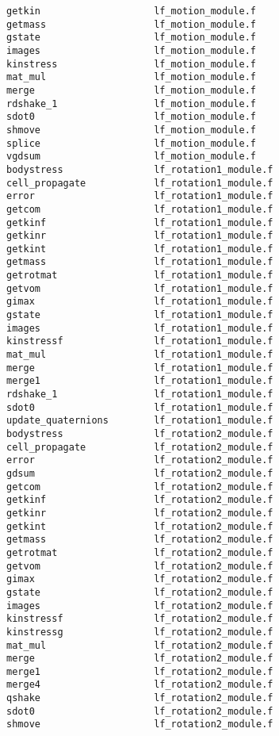 \begin{verbatim}
getkin                    lf_motion_module.f
getmass                   lf_motion_module.f
gstate                    lf_motion_module.f
images                    lf_motion_module.f
kinstress                 lf_motion_module.f
mat_mul                   lf_motion_module.f
merge                     lf_motion_module.f
rdshake_1                 lf_motion_module.f
sdot0                     lf_motion_module.f
shmove                    lf_motion_module.f
splice                    lf_motion_module.f
vgdsum                    lf_motion_module.f
bodystress                lf_rotation1_module.f
cell_propagate            lf_rotation1_module.f
error                     lf_rotation1_module.f
getcom                    lf_rotation1_module.f
getkinf                   lf_rotation1_module.f
getkinr                   lf_rotation1_module.f
getkint                   lf_rotation1_module.f
getmass                   lf_rotation1_module.f
getrotmat                 lf_rotation1_module.f
getvom                    lf_rotation1_module.f
gimax                     lf_rotation1_module.f
gstate                    lf_rotation1_module.f
images                    lf_rotation1_module.f
kinstressf                lf_rotation1_module.f
mat_mul                   lf_rotation1_module.f
merge                     lf_rotation1_module.f
merge1                    lf_rotation1_module.f
rdshake_1                 lf_rotation1_module.f
sdot0                     lf_rotation1_module.f
update_quaternions        lf_rotation1_module.f
bodystress                lf_rotation2_module.f
cell_propagate            lf_rotation2_module.f
error                     lf_rotation2_module.f
gdsum                     lf_rotation2_module.f
getcom                    lf_rotation2_module.f
getkinf                   lf_rotation2_module.f
getkinr                   lf_rotation2_module.f
getkint                   lf_rotation2_module.f
getmass                   lf_rotation2_module.f
getrotmat                 lf_rotation2_module.f
getvom                    lf_rotation2_module.f
gimax                     lf_rotation2_module.f
gstate                    lf_rotation2_module.f
images                    lf_rotation2_module.f
kinstressf                lf_rotation2_module.f
kinstressg                lf_rotation2_module.f
mat_mul                   lf_rotation2_module.f
merge                     lf_rotation2_module.f
merge1                    lf_rotation2_module.f
merge4                    lf_rotation2_module.f
qshake                    lf_rotation2_module.f
sdot0                     lf_rotation2_module.f
shmove                    lf_rotation2_module.f

\end{verbatim}
